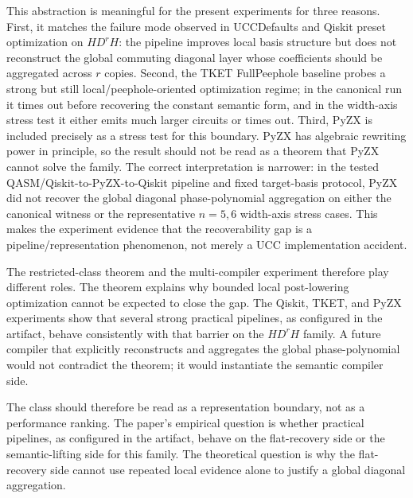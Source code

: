 \documentclass[11pt]{article}
\begin{document}
This abstraction is meaningful for the present experiments for three reasons.
First, it matches the failure mode observed in UCCDefaults and Qiskit preset
optimization on $H D^r H$: the pipeline improves local basis structure but does
not reconstruct the global commuting diagonal layer whose coefficients should
be aggregated across $r$ copies. Second, the TKET FullPeephole baseline probes
a strong but still local/peephole-oriented optimization regime; in the
canonical run it times out before recovering the constant semantic form, and
in the width-axis stress test it either emits much larger circuits or times
out. Third, PyZX is included precisely as a stress test for this boundary.
PyZX has algebraic rewriting power in principle, so the result should not be
read as a theorem that PyZX cannot solve the family. The correct interpretation
is narrower: in the tested QASM/Qiskit-to-PyZX-to-Qiskit pipeline and fixed
target-basis protocol, PyZX did not recover the global diagonal
phase-polynomial aggregation on either the canonical witness or the
representative $n=5,6$ width-axis stress cases. This makes the experiment
evidence that the recoverability gap is a pipeline/representation phenomenon,
not merely a UCC implementation accident.

The restricted-class theorem and the multi-compiler experiment therefore play
different roles. The theorem explains why bounded local post-lowering
optimization cannot be expected to close the gap. The Qiskit, TKET, and PyZX
experiments show that several strong practical pipelines, as configured in the
artifact, behave consistently with that barrier on the $H D^r H$ family. A
future compiler that explicitly reconstructs and aggregates the global
phase-polynomial would not contradict the theorem; it would instantiate the
semantic compiler side.

The class should therefore be read as a representation boundary, not as a
performance ranking. The paper's empirical question is whether practical
pipelines, as configured in the artifact, behave on the flat-recovery side or
the semantic-lifting side for this family. The theoretical question is why the
flat-recovery side cannot use repeated local evidence alone to justify a
global diagonal aggregation.
\end{document}
